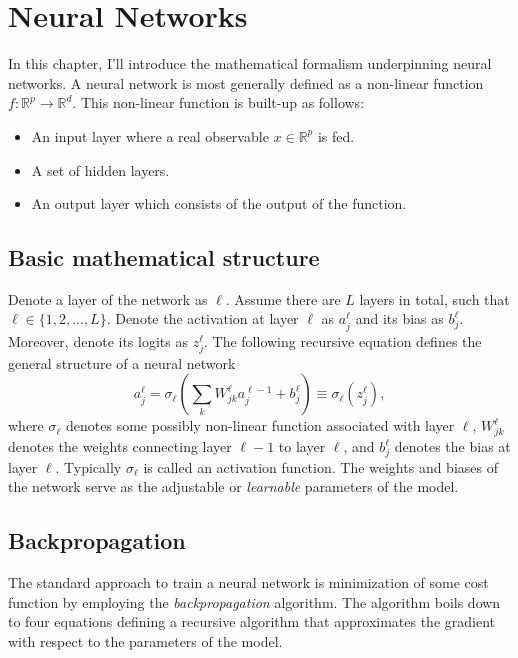 \section{Neural Networks}\label{sec:neural_networks}
In this chapter, I'll introduce the mathematical formalism underpinning
neural networks.
A neural network is most generally defined as a non-linear function $f : \mathbb{R}^p \to \mathbb{R}^d$. This non-linear function is built-up as follows:
\begin{itemize}
    \item An input layer where a real observable $x \in \mathbb{R}^p$ is fed.
    \item A set of hidden layers.
    \item An output layer which consists of the output of the function.
\end{itemize}

\subsection{Basic mathematical structure}
Denote a layer of the network as $\ell$. Assume there are $L$ layers in total, such that $\ell \in \{1,2,...,L\}$. Denote the activation at layer $\ell$ as $a_j^\ell$ and its bias as $b_j^\ell$. Moreover, denote its logits as $z_j^\ell$. The following recursive equation defines the general structure of a neural network
\begin{equation}
    a_j^\ell = \sigma_\ell \left(\sum_k W_{jk}^\ell a_j^{\ell - 1} + b_j^\ell\right) \equiv \sigma_\ell(z_j^\ell), 
\end{equation}
where $\sigma_\ell$ denotes some possibly non-linear function associated with layer $\ell$, $W_{jk}^\ell$ denotes the weights connecting layer $\ell-1$ to layer $\ell$, and $b_j^\ell$ denotes the bias at layer $\ell$. Typically $\sigma_\ell$ is called an activation function. The weights and biases of the network serve as the adjustable or \textit{learnable} parameters of the model.

\subsection{Backpropagation}
The standard approach to train a neural network is minimization of some cost function by employing the \textit{backpropagation} algorithm\cite{backprop}. The algorithm boils down to four equations defining a recursive algorithm that approximates the gradient with respect to the parameters of the model.

